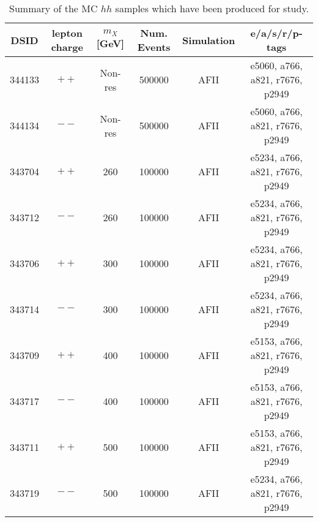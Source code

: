 \begin{table}
\centering
\small
\begin{tabular}{cccccc}
                        \hline
                        \hline
                        DSID & lepton charge & $m_X$ [GeV] & Num. Events & Simulation & e/a/s/r/p-tags\\
                        \hline
                        344133  &$++$  & Non-res &  500000 &  AFII &  e5060, a766, a821, r7676, p2949  \\
                        344134  &$--$ & Non-res &  500000 &  AFII &  e5060, a766, a821, r7676, p2949  \\
                        343704  &$++$ & 260     &  100000 &  AFII &  e5234, a766, a821, r7676, p2949 \\
                        343712  &$--$ & 260     &  100000 &  AFII &  e5234, a766, a821, r7676, p2949 \\
                        343706  &$++$ & 300     &  100000 &  AFII &  e5234, a766, a821, r7676, p2949 \\
                        343714  &$--$ & 300     &  100000 &  AFII &  e5234, a766, a821, r7676, p2949 \\
                        343709  &$++$ & 400     &  100000 &  AFII &  e5153, a766, a821, r7676, p2949 \\
                        343717  &$--$ & 400     &  100000 &  AFII &  e5153, a766, a821, r7676, p2949 \\
                        343711  &$++$ & 500     &  100000 &  AFII &  e5153, a766, a821, r7676, p2949 \\
                        343719  &$--$ & 500     &  100000 &  AFII &  e5234, a766, a821, r7676, p2949 \\
                        \hline
                        \hline
\end{tabular}
\caption{Summary of the MC $hh$ samples which have been produced for study.}
\label{tab:dsid_hh}
\end{table}
